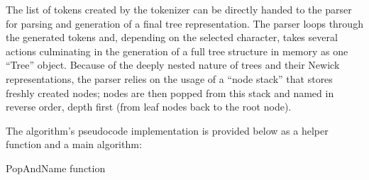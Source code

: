 \documentclass[10pt,letterpaper]{article}
\begin{document}
The list of tokens created by the tokenizer can be directly handed to the parser for parsing and generation of a final tree representation.  The parser loops through the generated tokens and, depending on the selected character, takes several actions culminating in the generation of a full tree structure in memory as one “Tree” object. Because of the deeply nested nature of trees and their Newick representations, the parser relies on the usage of a “node stack” that stores freshly created nodes; nodes are then popped from this stack and named in reverse order, depth first (from leaf nodes back to the root node). 

The algorithm’s pseudocode implementation is provided below as a helper function and a main algorithm:

\begin{algorithm}[H]
 
  



\BlankLine

\caption{PopAndName function}
\end{algorithm}
\end{document}
